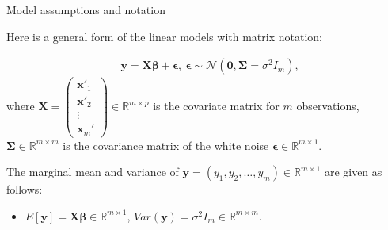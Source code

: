 \documentclass[ignorenonframetext,]{beamer}
\begin{document}
\begin{frame}{Model assumptions and notation}

Here is a general form of the linear models with matrix notation:

\begin{equation} \label{eq:linmodgen}
\begin{aligned}
&\bm{y} = \bm{X\beta + \epsilon}, \ \bm{\epsilon} \sim \mathcal{N}(\bm{0, \Sigma}=\sigma^2 I_m),
\end{aligned}
\end{equation}
where $\bm{X} = \begin{pmatrix} \mathbf{x}'_1 \\ \mathbf{x}'_2 \\ \vdots \\ \mathbf{x}_m' \end{pmatrix}\in \mathbb{R}^{m \times p}$ is the covariate matrix for $m$ observations, $\bm{\Sigma} \in \mathbb{R}^{m \times m}$ is the covariance matrix of the white noise $\bm{\epsilon} \in \mathbb{R}^{m \times 1}$. 

The marginal mean and variance of $\mathbf{y} = (y_1, y_2, \ldots, y_m) \in \mathbb{R}^{m \times 1}$ are given as follows:
\begin{itemize}
	\item $E[\bm{y}] = \bm{X\beta} \in \mathbb{R}^{m \times 1} $, $Var(\bm{y}) = \sigma^2 I_m \in \mathbb{R}^{m \times m}$.
\end{itemize}



\end{frame}
\end{document}
